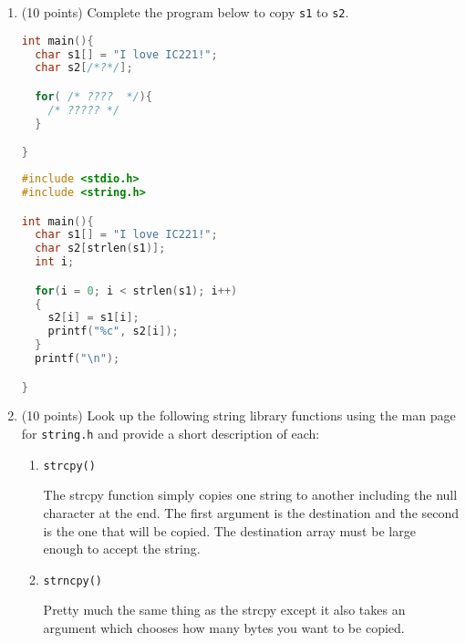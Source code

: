 \documentclass{article}[9pt]
\newenvironment{answerfont}{\fontfamily{qhv}\selectfont}{\par}
\newenvironment{myanswer}{\begin{mdframed}\begin{answerfont}}{\end{answerfont}\end{mdframed}}
\begin{document}
\begin{enumerate}
\begin{lstlisting}[language=c]
char s[] = "Beat Army\0Crash Airforce\0";

printf("1: %s\n",s);
printf("2: %s\n",s+17);
\end{lstlisting}

\begin{myanswer}
1: Beat Army\\
2: irforce
\end{myanswer}

\item (10 points) Complete the program below to copy \texttt{s1} to \texttt{s2}.

\begin{lstlisting}[language=c]
int main(){
  char s1[] = "I love IC221!";
  char s2[/*?*/];

  for( /* ????  */){
    /* ????? */
  }

}
\end{lstlisting}

\begin{myanswer}
\begin{lstlisting}[language=c]
#include <stdio.h>
#include <string.h>

int main(){
  char s1[] = "I love IC221!";
  char s2[strlen(s1)];
  int i;

  for(i = 0; i < strlen(s1); i++)
  {
    s2[i] = s1[i];
    printf("%c", s2[i]);
  }
  printf("\n");

}
\end{lstlisting}
\end{myanswer}

\item (10 points) Look up the following string library functions using the man
page for \texttt{string.h} and provide a short description of each:

\begin{enumerate}
\item \texttt{strcpy()}
\begin{myanswer}
The strcpy function simply copies one string to another including the null character at the end.
The first argument is the destination and the second is the one that will be copied. The destination array must
be large enough to accept the string.
\end{myanswer}

\item \texttt{strncpy()}
\begin{myanswer}
Pretty much the same thing as the strcpy except it also takes an argument which chooses how many bytes you want to be copied.
\end{myanswer}


\end{enumerate}
\end{enumerate}
\end{document}
